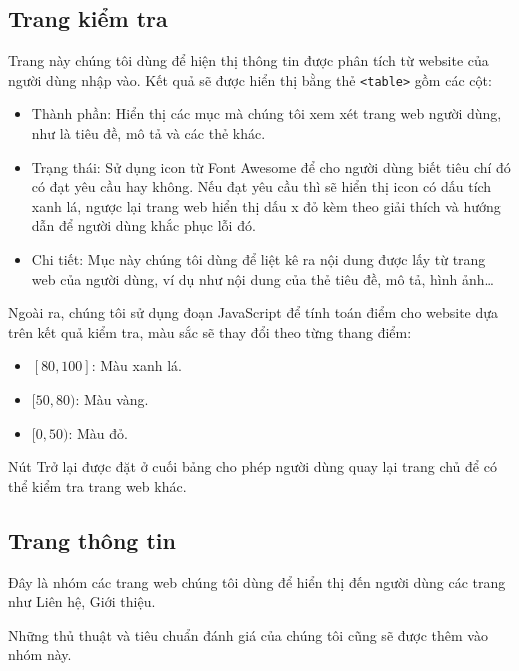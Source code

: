 \subsection{Trang kiểm tra}
Trang này chúng tôi dùng để hiện thị thông tin được phân tích từ website của người dùng nhập vào. Kết quả sẽ được hiển thị bằng thẻ \texttt{<table>} gồm các cột:
\begin{itemize}
	\item Thành phần: Hiển thị các mục mà chúng tôi xem xét trang web người dùng, như là tiêu đề, mô tả và các thẻ khác.
	\item Trạng thái: Sử dụng icon từ Font Awesome để cho người dùng biết tiêu chí đó có đạt yêu cầu hay không. Nếu đạt yêu cầu thì sẽ hiển thị icon có dấu tích xanh lá, ngược lại trang web hiển thị dấu x đỏ kèm theo giải thích và hướng dẫn để người dùng khắc phục lỗi đó.
	\item Chi tiết: Mục này chúng tôi dùng để liệt kê ra nội dung được lấy từ trang web của người dùng, ví dụ như nội dung của thẻ tiêu đề, mô tả, hình ảnh\ldots
\end{itemize}
\par
Ngoài ra, chúng tôi sử dụng đoạn JavaScript để tính toán điểm cho website dựa trên kết quả kiểm tra, màu sắc sẽ thay đổi theo từng thang điểm:
\begin{itemize}
	\item $[80, 100]$: Màu xanh lá.
	\item $[50, 80)$: Màu vàng.
	\item $[0, 50)$: Màu đỏ.
\end{itemize}
\par
Nút Trở lại được đặt ở cuối bảng cho phép người dùng quay lại trang chủ để có thể kiểm tra trang web khác.
\subsection{Trang thông tin}
Đây là nhóm các trang web chúng tôi dùng để hiển thị đến người dùng các trang như Liên hệ, Giới thiệu.
\par
Những thủ thuật và tiêu chuẩn đánh giá của chúng tôi cũng sẽ được thêm vào nhóm này.
